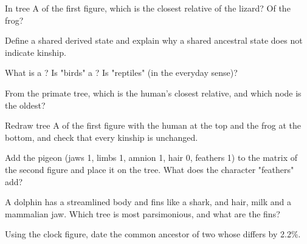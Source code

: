 \begin{exercise}[$\star$]\label{exo:g12:phylogenetic-trees:2}
In tree A of the first figure, which  is the closest relative
of the lizard? Of the frog?
\end{exercise}

\begin{exercise}[$\star$]\label{exo:g12:phylogenetic-trees:3}
Define a shared derived state and explain why a shared ancestral
state does not indicate kinship.
\end{exercise}

\begin{exercise}[$\star$]\label{exo:g12:phylogenetic-trees:4}
What is a ? Is "birds" a ? Is "reptiles" (in the everyday
sense)?
\end{exercise}

\begin{exercise}[$\star$]\label{exo:g12:phylogenetic-trees:5}
From the primate tree, which is the human's closest relative, and
which node is the oldest?
\end{exercise}

\begin{exercise}[$\star\star$]\label{exo:g12:phylogenetic-trees:6}
Redraw tree A of the first figure with the human at the top and the
frog at the bottom, and check that every kinship is unchanged.
\end{exercise}

\begin{exercise}[$\star\star$]\label{exo:g12:phylogenetic-trees:7}
Add the pigeon (jaws 1, limbs 1, amnion 1, hair 0, feathers 1) to the
matrix of the second figure and place it on the tree. What does the
character "feathers" add?
\end{exercise}

\begin{exercise}[$\star\star$]\label{exo:g12:phylogenetic-trees:8}
A dolphin has a streamlined body and fins like a shark, and hair, milk
and a mammalian jaw. Which tree is most parsimonious, and what are the
fins?
\end{exercise}

\begin{exercise}[$\star\star$]\label{exo:g12:phylogenetic-trees:9}
Using the clock figure, date the common ancestor of two  whose
 differs by 2.2\%.
\end{exercise}

